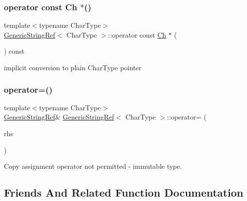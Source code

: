 \subsubsection{\texorpdfstring{operator const Ch $\ast$()}{operator const Ch *()}}
{\footnotesize\ttfamily template$<$typename Char\+Type$>$ \\
\hyperlink{structGenericStringRef}{Generic\+String\+Ref}$<$ Char\+Type $>$\+::operator const \hyperlink{structGenericStringRef_a16908c3fce41be380061330c14ba2140}{Ch} $\ast$ (\begin{DoxyParamCaption}{ }\end{DoxyParamCaption}) const\hspace{0.3cm}{\ttfamily [inline]}}



implicit conversion to plain Char\+Type pointer 

\mbox{\label{structGenericStringRef_a261406ab4ca7aa3fdd02fc3d152f0d0b}} 
\subsubsection{\texorpdfstring{operator=()}{operator=()}}
{\footnotesize\ttfamily template$<$typename Char\+Type$>$ \\
\hyperlink{structGenericStringRef}{Generic\+String\+Ref}\& \hyperlink{structGenericStringRef}{Generic\+String\+Ref}$<$ Char\+Type $>$\+::operator= (\begin{DoxyParamCaption}\item[{const \hyperlink{structGenericStringRef}{Generic\+String\+Ref}$<$ Char\+Type $>$ \&}]{rhs }\end{DoxyParamCaption})\hspace{0.3cm}{\ttfamily [private]}}



Copy assignment operator not permitted -\/ immutable type. 



\subsection{Friends And Related Function Documentation}
\mbox{\label{structGenericStringRef_aa6b9fd9f6aa49405a574c362ba9af6b5}} 
